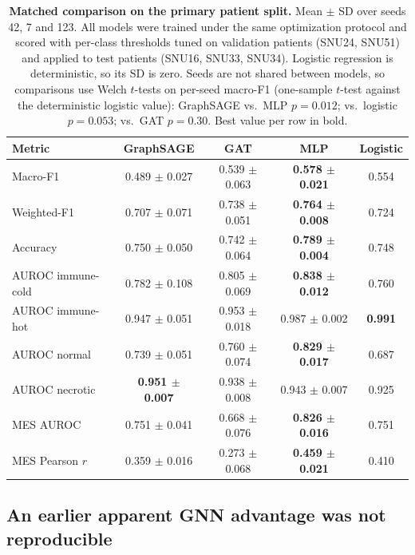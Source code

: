 \documentclass[11pt,letterpaper]{article}
\begin{document}
\begin{table}[H]
\centering
\caption{\textbf{Matched comparison on the primary patient split.} Mean $\pm$ SD over seeds 42, 7 and 123. All models were trained under the same optimization protocol and scored with per-class thresholds tuned on validation patients (SNU24, SNU51) and applied to test patients (SNU16, SNU33, SNU34). Logistic regression is deterministic, so its SD is zero. Seeds are not shared between models, so comparisons use Welch $t$-tests on per-seed macro-F1 (one-sample $t$-test against the deterministic logistic value): GraphSAGE vs.\ MLP $p = 0.012$; vs.\ logistic $p = 0.053$; vs.\ GAT $p = 0.30$. Best value per row in bold.}
\label{tab:comparison}
\small
\begin{tabular}{lcccc}
\toprule
\textbf{Metric} & \textbf{GraphSAGE} & \textbf{GAT} & \textbf{MLP} & \textbf{Logistic} \\
\midrule
Macro-F1            & 0.489 $\pm$ 0.027 & 0.539 $\pm$ 0.063 & \textbf{0.578 $\pm$ 0.021} & 0.554 \\
Weighted-F1         & 0.707 $\pm$ 0.071 & 0.738 $\pm$ 0.051 & \textbf{0.764 $\pm$ 0.008} & 0.724 \\
Accuracy            & 0.750 $\pm$ 0.050 & 0.742 $\pm$ 0.064 & \textbf{0.789 $\pm$ 0.004} & 0.748 \\
AUROC immune-cold   & 0.782 $\pm$ 0.108 & 0.805 $\pm$ 0.069 & \textbf{0.838 $\pm$ 0.012} & 0.760 \\
AUROC immune-hot    & 0.947 $\pm$ 0.051 & 0.953 $\pm$ 0.018 & 0.987 $\pm$ 0.002 & \textbf{0.991} \\
AUROC normal        & 0.739 $\pm$ 0.051 & 0.760 $\pm$ 0.074 & \textbf{0.829 $\pm$ 0.017} & 0.687 \\
AUROC necrotic      & \textbf{0.951 $\pm$ 0.007} & 0.938 $\pm$ 0.008 & 0.943 $\pm$ 0.007 & 0.925 \\
MES AUROC           & 0.751 $\pm$ 0.041 & 0.668 $\pm$ 0.076 & \textbf{0.826 $\pm$ 0.016} & 0.751 \\
MES Pearson $r$     & 0.359 $\pm$ 0.016 & 0.273 $\pm$ 0.068 & \textbf{0.459 $\pm$ 0.021} & 0.410 \\
\bottomrule
\end{tabular}
\end{table}

\subsection{An earlier apparent GNN advantage was not reproducible}
\end{document}
